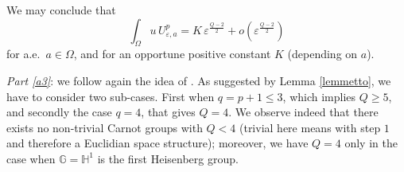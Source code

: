 \documentclass[11pt]{amsart}
\numberwithin{equation}{section} %
\theoremstyle{definition}
\newcommand{\cor}{\textit}
\begin{document}
We may conclude that
\[
\int_\Omega u\, U_{\varepsilon,a}^p=K\, \varepsilon^{\frac{Q-2}{2}}+o\left(\varepsilon^{\frac{Q-2}{2}}\right)
\]
for a.e.~$a\in\Omega$,
and for an opportune positive constant $K$ (depending on $a$).

\cor{Part \eqref{a3}}: we follow again the idea of \cite{BrezisNirenberg}.
As suggested by Lemma \ref{lemmetto}, we have to consider two sub-cases. First when $q=p+1\leq 3$, which implies $Q\geq 5$,
 and secondly the case $q=4$, that gives $Q= 4$. We observe indeed that 
 there exists no non-trivial Carnot groups with $Q<4$
 (trivial here means with step $1$ and therefore a Euclidian space structure);
 {moreover, we have $Q = 4$ only in the case when 
 $\mathbb{G} = \mathbb{H}^1$ is the first Heisenberg group}.
\vspace{0.1cm}
\end{document}
